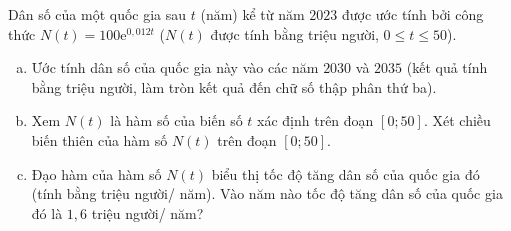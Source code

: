 \begin{bt}%

	Dân số của một quốc gia sau $t$ (năm) kể từ năm $2023$ được ước tính bởi công thức $N(t)=100\mathrm{e}^{0, 012t}$ ($N(t)$ được tính bằng triệu người, $0\le t\le 50$).
	\begin{enumerate}[a) ]
		\item Ước tính dân số của quốc gia này vào các năm $2030$ và $2035$ (kết quả tính bằng triệu người, làm tròn kết quả đến chữ số thập phân thứ ba). 
		\item Xem $N(t)$ là hàm số của biến số $t$ xác định trên đoạn $\left[0;50\right]$. Xét chiều biến thiên của hàm số $N(t)$ trên đoạn $\left[0;50\right]$. 
		\item Đạo hàm của hàm số $N(t)$ biểu thị tốc độ tăng dân số của quốc gia đó (tính bằng triệu người/ năm). Vào năm nào tốc độ tăng dân số của quốc gia đó là $1{,}6$ triệu người/ năm?
	\end{enumerate}
\end{bt}

